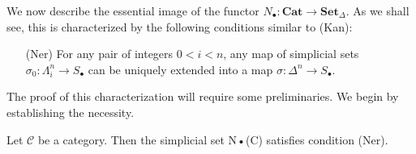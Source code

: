 We now describe the essential image of the functor $N_\bullet:\mathbf{Cat}\to\mathbf{Set}_\Delta$. As we shall see, this is characterized by the following conditions similar to (Kan):
\begin{enumerate}[leftmargin=40pt]
\item[(Ner)] For any pair of integers $0<i<n$, any map of simplicial sets $\sigma_0:\Lambda_i^n\to S_\bullet$ can be uniquely extended into a map $\sigma:\Delta^n\to S_\bullet$.
\end{enumerate}
The proof of this characterization will require some preliminaries. We begin by establishing the necessity.
\begin{lemma}\label{simplicial set nerve of cat satisfy condition Ner}
Let $\mathcal{C}$ be a category. Then the simplicial set N•(C) satisfies condition (Ner).
\end{lemma}
